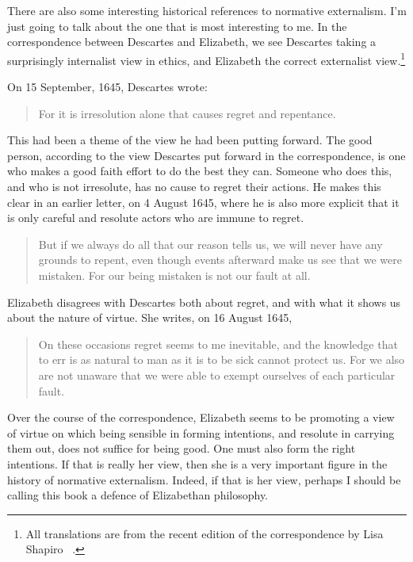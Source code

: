 There are also some interesting historical references to normative externalism. I'm just going to talk about the one that is most interesting to me. In the correspondence between Descartes and Elizabeth, we see Descartes taking a surprisingly internalist view in ethics, and Elizabeth the correct externalist view.\footnote{All translations are from the recent edition of the correspondence by Lisa Shapiro ~\citep{Shapiro2007}.}

On 15 September, 1645, Descartes wrote:

\begin{quote}
For it is irresolution alone that causes regret and repentance.
\end{quote}
This had been a theme of the view he had been putting forward. The good person, according to the view Descartes put forward in the correspondence, is one who makes a good faith effort to do the best they can. Someone who does this, and who is not irresolute, has no cause to regret their actions. He makes this clear in an earlier letter, on 4 August 1645, where he is also more explicit that it is only careful and resolute actors who are immune to regret.

\begin{quote}
But if we always do all that our reason tells us, we will never have any grounds to repent, even though events afterward make us see that we were mistaken. For our being mistaken is not our fault at all.
\end{quote}
Elizabeth disagrees with Descartes both about regret, and with what it shows us about the nature of virtue. She writes, on 16 August 1645,

\begin{quote}
On these occasions regret seems to me inevitable, and the knowledge that to err is as natural to man as it is to be sick cannot protect us. For we also are not unaware that we were able to exempt ourselves of each particular fault.
\end{quote}
Over the course of the correspondence, Elizabeth seems to be promoting a view of virtue on which being sensible in forming intentions, and resolute in carrying them out, does not suffice for being good. One must also form the right intentions. If that is really her view, then she is a very important figure in the history of normative externalism. Indeed, if that is her view, perhaps I should be calling this book a defence of Elizabethan philosophy.

